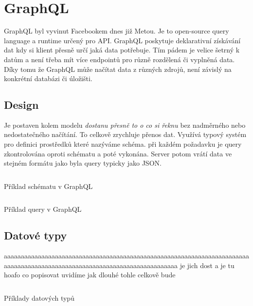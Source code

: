 \section{GraphQL}
GraphQL byl vyvinut Facebookem dnes již Metou. Je to open-source query language a runtime určený pro API. GraphQL poskytuje deklarativní získávání dat kdy si klient přesně určí jaká data potřebuje. Tím pádem je velice šetrný k datům a není třeba mít více endpointů pro různě rozdělená či vyplněná data. Díky tomu že GraphQL může načítat data z různých zdrojů, není závislý na konkrétní databázi či úložišti.

\subsection{Design}
Je postaven kolem modelu \textit{dostanu přesně to o co si řeknu} bez nadměrného nebo nedostatečného načítání. To celkově zrychluje přenos dat. Využívá typový systém pro definici prostředků které nazýváme schéma. při každém požadavku je query zkontrolována oproti schématu a poté vykonána. Server potom vrátí data ve stejném formátu jako byla query typicky jako JSON.

\begin{listing}[h!]
    \inputminted[]{ts}{resources/code/playertype.gql}
    \caption{Příklad schématu v GraphQL}
    \label{code:gql_type}
\end{listing}

\begin{listing}[h!]
    \inputminted[]{graphql}{resources/code/playerquery.gql}
    \caption{Příklad query v GraphQL}
    \label{code:gql_querry}
\end{listing}

\subsection{Datové typy}
aaaaaaaaaaaaaaaaaaaaaaaaaaaaaaaaaaaaaaaaaaaaaaaaaaaaaaaaaaaaaaaaaaaaaaaaaaaaaaaaaaaaaaaaaaaaaaaaaaaaaaaaaaaaaaaaaaaaaaaaaaa
je jich dost a je tu hoafo co popisovat uvidíme jak dlouhé tohle celkově bude


\begin{listing}[h]
    \inputminted[]{graphql}{resources/code/types.example.gql}
    \caption{Příklady datových typů}
    \label{code:gql_datatypes}
\end{listing}

